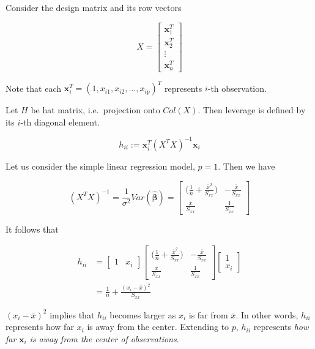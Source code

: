 \documentclass[]{book}
\theoremstyle{definition}
\theoremstyle{definition}
\theoremstyle{definition}
\theoremstyle{remark}
\let\BeginKnitrBlock\begin \let\EndKnitrBlock\end
\begin{document}
Consider the design matrix and its row vectors

\[
X = \begin{bmatrix}
  \mathbf{x}_1^T \\
  \mathbf{x}_2^T \\
  \vdots \\
  \mathbf{x}_n^T
\end{bmatrix}
\]

Note that each \(\mathbf{x}_i^T = (1, x_{i1}, x_{i2}, \ldots, x_{ip})^T\) represents \(i\)-th observation.

\BeginKnitrBlock{definition}[Leverage]
\protect\hypertarget{def:hati}{}{\label{def:hati} {} }Let \(H\) be hat matrix, i.e.~projection onto \(Col(X)\). Then leverage is defined by its \(i\)-th diagonal element.

\[h_{ii} := \mathbf{x}_i^T (X^T X)^{-1} \mathbf{x}_i\]
\EndKnitrBlock{definition}

Let us consider the simple linear regression model, \(p = 1\). Then we have

\[
(X^T X)^{-1} = \frac{1}{\sigma^2} Var(\boldsymbol{\hat\beta}) = \begin{bmatrix}
  \bigg(\frac{1}{n} + \frac{\overline{x}^2}{S_{xx}}) & - \frac{\overline{x}}{S_{xx}} \\
  \frac{\overline{x}}{S_{xx}} & \frac{1}{S_{xx}}
\end{bmatrix}
\]

It follows that

\begin{equation*}
  \begin{split}
    h_{ii} & = \begin{bmatrix}
      1 & x_i
    \end{bmatrix} \begin{bmatrix}
    \bigg(\frac{1}{n} + \frac{\overline{x}^2}{S_{xx}}) & - \frac{\overline{x}}{S_{xx}} \\
    \frac{\overline{x}}{S_{xx}} & \frac{1}{S_{xx}}
  \end{bmatrix} \begin{bmatrix}
    1 \\
    x_i
  \end{bmatrix} \\
  & = \frac{1}{n} + \frac{(x_i - \overline{x})^2}{S_{xx}}
  \end{split}
\end{equation*}

\((x_i - \overline{x})^2\) implies that \(h_{ii}\) becomes larger as \(x_i\) is far from \(\overline{x}\). In other words, \(h_{ii}\) represents how far \(x_i\) is away from the center. Extending to \(p\), \(h_{ii}\) represents \emph{how far} \(\mathbf{x}_i\) \emph{is away from the center of observations}.
\end{document}

